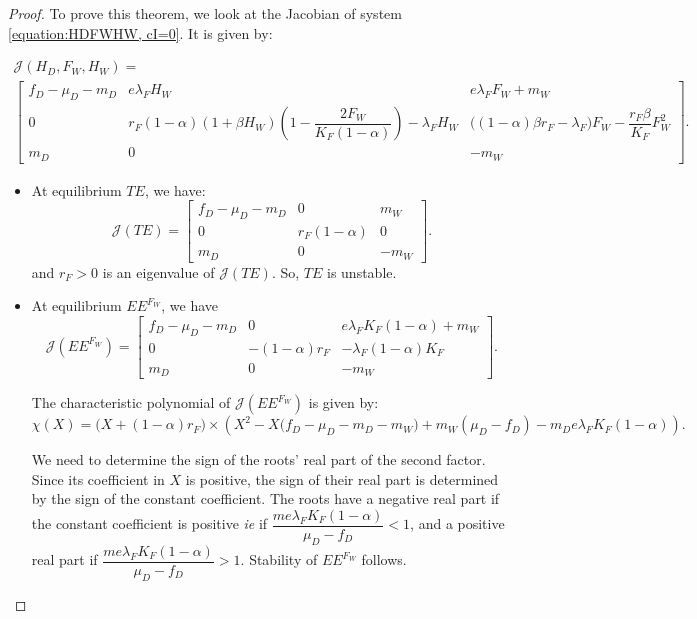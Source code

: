 \documentclass{article}
\newcommand{\lfw}{\lambda_{F}}
\newcommand{\lfw}{\lambda_{F}}
\begin{document}
\begin{proof}
To prove this theorem, we look at the Jacobian of system \eqref{equation:HDFWHW, cI=0}. It is given by:

\begin{multline*}
\mathcal{J}(H_D, F_W, H_W) = \\
\begin{bmatrix}
f_D-\mu_D - m_D & e \lfw H_W & e\lfw F_W + m_W \\
0 & r_F(1-\alpha)(1+\beta H_W) \left( 1 - \dfrac{2F_W}{K_F(1-\alpha)} \right) - \lfw H_W & \Big((1-\alpha)\beta r_F - \lfw \Big) F_W -  \dfrac{r_F\beta}{K_F} F_W^2\\
m_D & 0 & -m_W
\end{bmatrix}.
\end{multline*}

\begin{itemize}
\item At equilibrium $TE$, we have:
\begin{equation*}
\mathcal{J}(TE) = \begin{bmatrix}
f_D-\mu_D - m_D & 0 &  m_W \\
0 & r_F(1-\alpha)  &  0\\
m_D & 0 & -m_W
\end{bmatrix}.
\end{equation*}
and $r_F > 0$ is an eigenvalue of $\mathcal{J}(TE)$. So, $TE$ is unstable.
\item At equilibrium $EE^{F_W}$, we have
\begin{equation*}
\mathcal{J}(EE^{F_W}) = \begin{bmatrix}
f_D-\mu_D - m_D & 0 & e\lfw K_F(1-\alpha) + m_W \\
0 & -(1-\alpha)r_F  & -\lfw(1-\alpha)K_F  \\
m_D & 0 & -m_W
\end{bmatrix}.
\end{equation*}

The characteristic polynomial of $\mathcal{J}(EE^{F_W})$ is given by:
\begin{equation*}
\chi(X) = \big(X +(1-\alpha)r_F\big) \times \left(X^2 - X\Big(f_D - \mu_D - m_D - m_W \Big) + m_W(\mu_D - f_D) - m_D e \lfw K_F(1-\alpha) \right).
\end{equation*}

We need to determine the sign of the roots' real part of the second factor. Since its coefficient in $X$ is positive, the sign of their real part is determined by the sign of the constant coefficient.
The roots have a negative real part if the constant coefficient is positive \textit{ie} if $\dfrac{m e \lfw K_F(1-\alpha)}{\mu_D - f_D} < 1 $, and a positive real part if $\dfrac{m e \lfw K_F(1-\alpha)}{\mu_D - f_D} > 1 $. Stability of $EE^{F_W}$ follows.


\end{itemize}
\end{proof}
\end{document}
